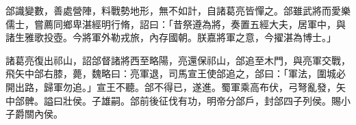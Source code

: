 \begin{pinyinscope}
郃識變數，善處營陣，料戰勢地形，無不如計，自諸葛亮皆憚之。郃雖武將而愛樂儒士，嘗薦同鄉卑湛經明行脩，詔曰：「昔祭遵為將，奏置五經大夫，居軍中，與諸生雅歌投壺。今將軍外勒戎旅，內存國朝。朕嘉將軍之意，今擢湛為博士。」

諸葛亮復出祁山，詔郃督諸將西至略陽，亮還保祁山，郃追至木門，與亮軍交戰，飛矢中郃右膝，薨，魏略曰：亮軍退，司馬宣王使郃追之，郃曰：「軍法，圍城必開出路，歸軍勿追。」宣王不聽。郃不得已，遂進。蜀軍乘高布伏，弓弩亂發，矢中郃髀。謚曰壯侯。子雄嗣。郃前後征伐有功，明帝分郃戶，封郃四子列侯。賜小子爵關內侯。


\end{pinyinscope}